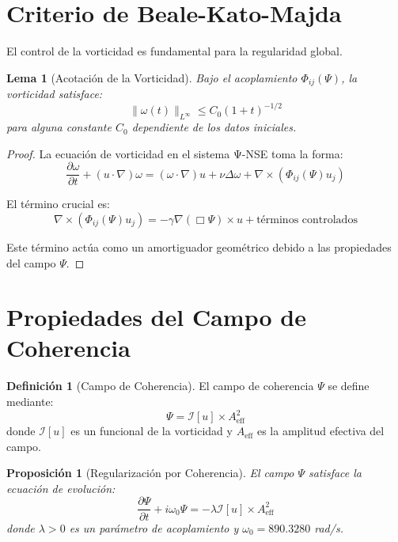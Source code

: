 \documentclass[12pt,a4paper]{article}
\newtheorem{lemma}{Lema}
\newtheorem{proposition}{Proposición}
\theoremstyle{definition}
\newtheorem{definition}{Definición}
\theoremstyle{remark}
\begin{document}
\section{Criterio de Beale-Kato-Majda}

El control de la vorticidad es fundamental para la regularidad global.

\begin{lemma}[Acotación de la Vorticidad]
Bajo el acoplamiento $\Phi_{ij}(\Psi)$, la vorticidad satisface:
\begin{equation}
\|\omega(t)\|_{L^\infty} \leq C_0 (1 + t)^{-1/2}
\end{equation}
para alguna constante $C_0$ dependiente de los datos iniciales.
\end{lemma}

\begin{proof}
La ecuación de vorticidad en el sistema Ψ-NSE toma la forma:
\begin{equation}
\frac{\partial \omega}{\partial t} + (u \cdot \nabla)\omega = (\omega \cdot \nabla)u + 
\nu \Delta \omega + \nabla \times (\Phi_{ij}(\Psi) u_j)
\end{equation}

El término crucial es:
\begin{equation}
\nabla \times (\Phi_{ij}(\Psi) u_j) = -\gamma \nabla (\Box\Psi) \times u + \text{términos controlados}
\end{equation}

Este término actúa como un amortiguador geométrico debido a las propiedades del 
campo $\Psi$.
\end{proof}

\section{Propiedades del Campo de Coherencia}

\begin{definition}[Campo de Coherencia]
El campo de coherencia $\Psi$ se define mediante:
\begin{equation}
\Psi = \mathcal{I}[u] \times A_{\text{eff}}^2
\end{equation}
donde $\mathcal{I}[u]$ es un funcional de la vorticidad y $A_{\text{eff}}$ es la 
amplitud efectiva del campo.
\end{definition}

\begin{proposition}[Regularización por Coherencia]
El campo $\Psi$ satisface la ecuación de evolución:
\begin{equation}
\frac{\partial \Psi}{\partial t} + i\omega_0 \Psi = -\lambda \mathcal{I}[u] \times A_{\text{eff}}^2
\end{equation}
donde $\lambda > 0$ es un parámetro de acoplamiento y $\omega_0 = 890.3280$ rad/s.
\end{proposition}
\end{document}
